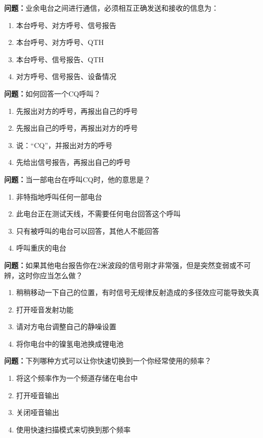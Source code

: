 \documentclass{ctexbook}%
\begin{document}
\textbf{问题：}业余电台之间进行通信，必须相互正确发送和接收的信息为：
\begin{enumerate}[label=\Alph*), leftmargin=3em]
\item 本台呼号、对方呼号、信号报告
\item 本台呼号、对方呼号、QTH
\item 本台呼号、信号报告、QTH
\item 对方呼号、信号报告、设备情况
\end{enumerate}

\textbf{问题：}如何回答一个CQ呼叫？
\begin{enumerate}[label=\Alph*), leftmargin=3em]
\item 先报出对方的呼号，再报出自己的呼号
\item 先报出自己的呼号，再报出对方的呼号
\item 说：“CQ”，并报出对方的呼号
\item 先给出信号报告，再报出自己的呼号
\end{enumerate}

\textbf{问题：}当一部电台在呼叫CQ时，他的意思是？
\begin{enumerate}[label=\Alph*), leftmargin=3em]
\item 非特指地呼叫任何一部电台
\item 此电台正在测试天线，不需要任何电台回答这个呼叫
\item 只有被呼叫的电台可以回答，其他人不能回答
\item 呼叫重庆的电台
\end{enumerate}

\textbf{问题：}如果其他电台报告你在2米波段的信号刚才非常强，但是突然变弱或不可辨，这时你应当怎么做？
\begin{enumerate}[label=\Alph*), leftmargin=3em]
\item 稍稍移动一下自己的位置，有时信号无规律反射造成的多径效应可能导致失真
\item 打开哑音发射功能
\item 请对方电台调整自己的静噪设置
\item 将你电台中的镍氢电池换成锂电池
\end{enumerate}

\textbf{问题：}下列哪种方式可以让你快速切换到一个你经常使用的频率？
\begin{enumerate}[label=\Alph*), leftmargin=3em]
\item 将这个频率作为一个频道存储在电台中
\item 打开哑音输出
\item 关闭哑音输出
\item 使用快速扫描模式来切换到那个频率
\end{enumerate}
\end{document}
